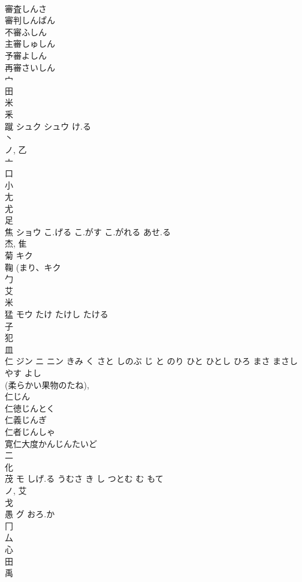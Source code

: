 \documentclass[8pt]{extreport}
\begin{document}
\begin{CJK}{UTF8}{min}
\\	審査しんさ
\\	審判しんぱん
\\	不審ふしん
\\	主審しゅしん
\\	予審よしん
\\	再審さいしん
\\	宀 
\\	田 
\\	米 
\\	釆 
\\	蹴	シュク シュウ	け.る	
\\	丶 
\\	ノ, 乙 
\\	亠 
\\	口 
\\	小 
\\	尢 
\\	尤 
\\	足 
\\	焦	ショウ	こ.げる こ.がす こ.がれる あせ.る	
\\	杰, 隹 
\\	菊	キク		
\\	鞠 (まり、キク 
\\	勹 
\\	艾 
\\	米 
\\	猛	モウ	たけ たけし たける	
\\	子 
\\	犯 
\\	皿 
\\	仁	ジン ニ ニン	きみ く さと しのぶ じ と のり ひと ひとし ひろ まさ まさし やす よし	
\\	(柔らかい果物のたね), 
\\	仁じん
\\	仁徳じんとく
\\	仁義じんぎ
\\	仁者じんしゃ
\\	寛仁大度かんじんたいど
\\	二 
\\	化 
\\	茂	モ	しげ.る うむさ き し つとむ む もて	
\\	ノ, 艾 
\\	戈 
\\	愚	グ	おろ.か	
\\	冂 
\\	厶 
\\	心 
\\	田 
\\	禹 

\end{CJK}
\end{document}
